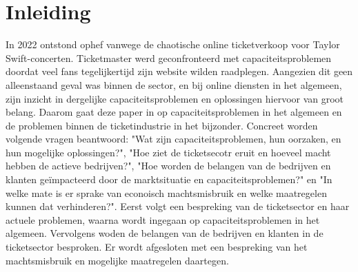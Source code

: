 
\section{Inleiding}

In 2022 ontstond ophef vanwege de chaotische online ticketverkoop voor
Taylor Swift-concerten. Ticketmaster werd geconfronteerd met capaciteitsproblemen doordat 
veel fans tegelijkertijd zijn website wilden raadplegen. Aangezien dit geen alleenstaand
geval was binnen de sector, en bij online diensten in het algemeen, zijn inzicht in 
dergelijke capaciteitsproblemen en oplossingen hiervoor van groot belang. Daarom
gaat deze paper in op capaciteitsproblemen in het algemeen en de problemen
binnen de ticketindustrie in het bijzonder. Concreet worden volgende vragen
beantwoord: "Wat zijn capaciteitsproblemen, hun oorzaken, en hun mogelijke
oplossingen?", "Hoe ziet de ticketsecotr eruit en hoeveel macht hebben de
actieve bedrijven?", "Hoe worden de belangen van de bedrijven en klanten
geïmpacteerd door de marktsituatie en capaciteitsproblemen?" en
"In welke mate is er sprake van econoisch machtsmisbruik en welke maatregelen
kunnen dat verhinderen?". Eerst volgt een bespreking van de ticketsector en
haar actuele problemen, waarna wordt ingegaan op capaciteitsproblemen
in het algemeen. Vervolgens woden de belangen van de bedrijven en klanten
in de ticketsector besproken. Er wordt afgesloten met een bespreking van het
machtsmisbruik en mogelijke maatregelen daartegen.